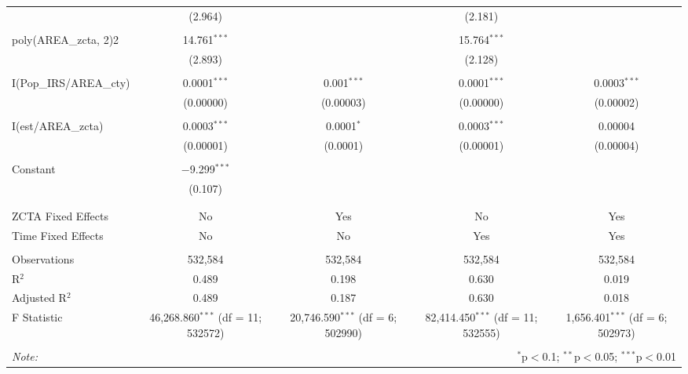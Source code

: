 \begin{table}[!htbp]
\begin{tabular}{@{\extracolsep{5pt}}lcccc}
  & (2.964) &  & (2.181) &  \\ 
  & & & & \\ 
 poly(AREA\_zcta, 2)2 & 14.761$^{***}$ &  & 15.764$^{***}$ &  \\ 
  & (2.893) &  & (2.128) &  \\ 
  & & & & \\ 
 I(Pop\_IRS/AREA\_cty) & 0.0001$^{***}$ & 0.001$^{***}$ & 0.0001$^{***}$ & 0.0003$^{***}$ \\ 
  & (0.00000) & (0.00003) & (0.00000) & (0.00002) \\ 
  & & & & \\ 
 I(est/AREA\_zcta) & 0.0003$^{***}$ & 0.0001$^{*}$ & 0.0003$^{***}$ & 0.00004 \\ 
  & (0.00001) & (0.0001) & (0.00001) & (0.00004) \\ 
  & & & & \\ 
 Constant & $-$9.299$^{***}$ &  &  &  \\ 
  & (0.107) &  &  &  \\ 
  & & & & \\ 
\hline \\[-1.8ex] 
 ZCTA Fixed Effects & No & Yes & No & Yes \\
 Time Fixed Effects & No & No & Yes & Yes \\
\hline \\[-1.8ex] 
Observations & 532,584 & 532,584 & 532,584 & 532,584 \\ 
R$^{2}$ & 0.489 & 0.198 & 0.630 & 0.019 \\ 
Adjusted R$^{2}$ & 0.489 & 0.187 & 0.630 & 0.018 \\ 
F Statistic & 46,268.860$^{***}$ (df = 11; 532572) & 20,746.590$^{***}$ (df = 6; 502990) & 82,414.450$^{***}$ (df = 11; 532555) & 1,656.401$^{***}$ (df = 6; 502973) \\ 
\hline 
\hline \\[-1.8ex] 
\textit{Note:}  & \multicolumn{4}{r}{$^{*}$p$<$0.1; $^{**}$p$<$0.05; $^{***}$p$<$0.01} \\ 
\end{tabular} 
\end{table} 
